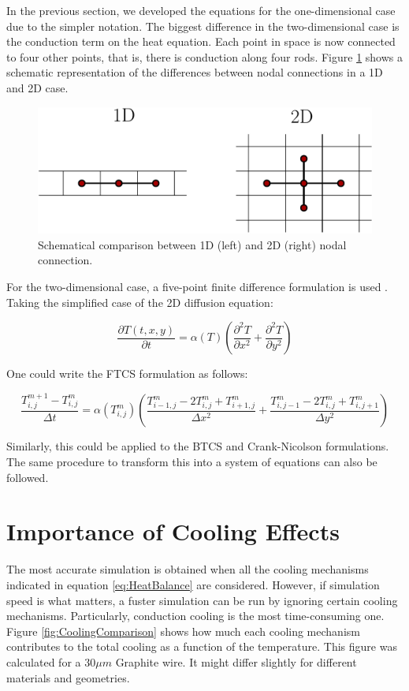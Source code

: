 In the previous section, we developed the equations for the one-dimensional case due to the simpler notation. The biggest difference in the two-dimensional case is the conduction term on the heat equation. Each point in space is now connected to four other points, that is, there is conduction along four rods. Figure \ref{fig:1Dvs2D} shows a schematic representation of the differences between nodal connections in a 1D and 2D case.  

\begin{figure}[h]
    \centering
    \includegraphics[width=0.60\columnwidth]{1D_vs_2D_cond/1Dvs2F.pdf}
    \caption{Schematical comparison between 1D (left) and 2D (right) nodal connection.}
    \label{fig:1Dvs2D}
\end{figure}

For the two-dimensional case, a five-point finite difference formulation is used \parencite[][]{ref:FiniteDifference}. Taking the simplified case of the 2D diffusion equation: 

\begin{equation}
    \frac{\partial T(t,x,y)}{\partial t} = \alpha (T) \left(\frac{\partial^2 T}{\partial x^2}+\frac{\partial ^2 T}{\partial y^2}\right)
\end{equation}

One could write the FTCS formulation as follows: 

\begin{equation}
    \frac{T_{i,j}^{m+1} - T_{i,j}^{m}}{\Delta t} = \alpha(T_{i,j}^{m}) \left( \frac{T_{i-1,j}^{m} -2T_{i,j}^{m}+T_{i+1,j}^{m}}{\Delta x^2} +  \frac{T_{i,j-1}^{m}-2T_{i,j}^{m}+T_{i,j+1}^{m}}{\Delta y^2} \right)
\end{equation}

Similarly, this could be applied to the BTCS and Crank-Nicolson formulations. The same procedure to transform this into a system of equations can also be followed. 

\section{Importance of Cooling Effects}

The most accurate simulation is obtained when all the cooling mechanisms indicated in equation \ref{eq:HeatBalance} are considered. However, if simulation speed is what matters, a fuster simulation can be run by ignoring certain cooling mechanisms. Particularly, conduction cooling is the most time-consuming one. Figure \ref{fig:CoolingComparison} shows how much each cooling mechanism contributes to the total cooling as a function of the temperature. This figure was calculated for a $30 \mu m$ Graphite wire. It might differ slightly for different materials and geometries. 

